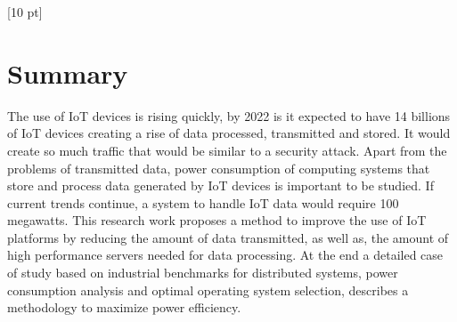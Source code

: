 \titleformat{\chapter}{\Huge\bfseries}{\thechapter}{0 pt}{\rule{340 pt}{3 pt}\\}
\titlespacing{\chapter}{100 pt}{-25 pt}{40 pt}[10 pt]	
\pagestyle{fancy}
\fancyhead[RO,RE]{\thepage}
\fancyfoot[CO,CE]{}

\chapter*{Summary}


\normalsize
\noindent 

The use of IoT devices is rising quickly, by 2022 is it expected to have 14
billions of IoT devices creating a rise of data processed, transmitted and
stored. It would create so much traffic that would be similar to a security
attack. Apart from the problems of transmitted data, power consumption of
computing systems that store and process data generated by IoT devices is
important to be studied. If current trends continue, a system to handle IoT
data would require 100 megawatts. This research work proposes a method to
improve the use of IoT platforms by reducing the amount of data
transmitted, as well as, the amount of high performance servers needed for data
processing. At the end a detailed case of study based on industrial benchmarks
for distributed systems, power consumption analysis and optimal operating
system selection, describes a methodology to maximize power efficiency.

\clearpage
